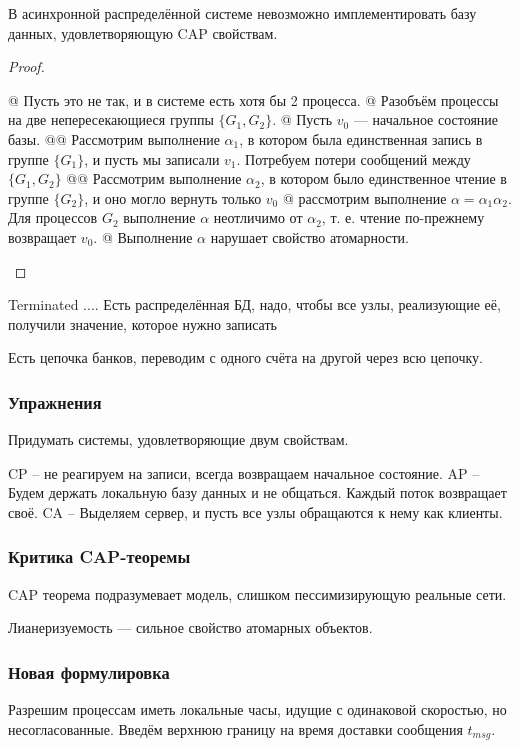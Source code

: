 \begin{thm}
В асинхронной распределённой системе невозможно имплементировать базу данных, удовлетворяющую CAP свойствам.
\end{thm}
\begin{proof}
\begin{el}[ul]
@ Пусть это не так, и в системе есть хотя бы 2 процесса.
@ Разобъём процессы на две непересекающиеся группы $\{G_1, G_2\}$.
@ Пусть $v_0$ — начальное состояние базы.
@@ Рассмотрим выполнение $\alpha_1$, в котором была единственная запись в группе $\{G_1\}$, и пусть мы записали $v_1$.
Потребуем потери сообщений между $\{G_1, G_2\}$
@@ Рассмотрим выполнение $\alpha_2$, в котором было единственное чтение в группе $\{G_2\}$, и оно могло вернуть только $v_0$
@ рассмотрим выполнение $\alpha = \alpha_1 \alpha_2$. Для процессов $G_2$ выполнение $\alpha$ неотличимо от $\alpha_2$, т. е. чтение по-прежнему возвращает $v_0$.
@ Выполнение $\alpha$ нарушает свойство атомарности.
\end{el}
\end{proof}

Terminated  .... Есть распределённая БД, надо, чтобы все узлы, реализующие её, получили значение, которое нужно записать

Есть цепочка банков, переводим с одного счёта на другой через всю цепочку.

\subsubsection{Упражнения}
Придумать системы, удовлетворяющие двум свойствам.

CP -- не реагируем на записи, всегда возвращаем начальное состояние. 
AP -- Будем держать локальную базу данных и не общаться. Каждый поток возвращает своё.
CA -- Выделяем сервер, и пусть все узлы обращаются к нему как клиенты.

\subsubsection{Критика CAP-теоремы}
CAP теорема подразумевает модель, слишком пессимизирующую реальные сети.

Лианеризуемость --- сильное свойство атомарных объектов.

\subsubsection{Новая формулировка}
Разрешим процессам иметь локальные часы, идущие с одинаковой скоростью, но несогласованные. Введём верхнюю границу на время доставки сообщения $t_{msg}$.

